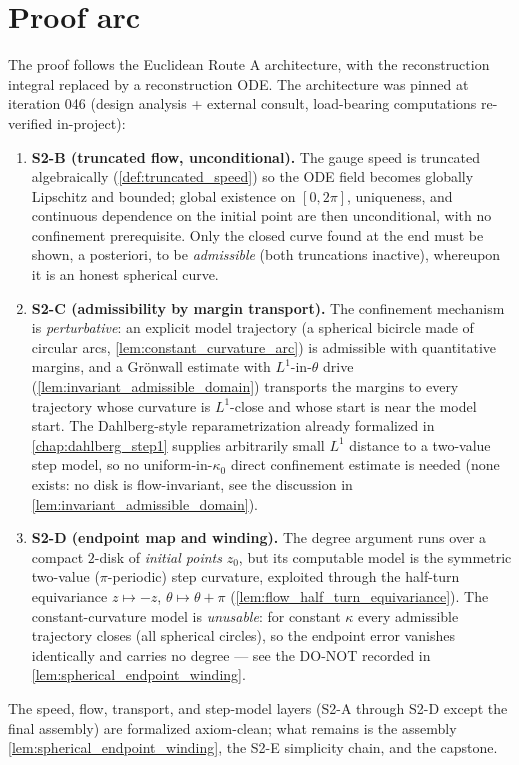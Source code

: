 \section{Proof arc}
\label{sec:sphere_arc}

The proof follows the Euclidean Route A architecture, with the reconstruction integral
replaced by a reconstruction ODE. The architecture was pinned at iteration 046
(design analysis + external consult, load-bearing computations re-verified in-project):
\begin{enumerate}
\item \textbf{S2-B (truncated flow, unconditional).} The gauge speed is truncated
  algebraically (\cref{def:truncated_speed}) so the ODE field becomes globally
  Lipschitz and bounded; global existence on $[0,2\pi]$, uniqueness, and continuous
  dependence on the initial point are then unconditional, with no confinement
  prerequisite. Only the closed curve found at the end must be shown, a posteriori, to
  be \emph{admissible} (both truncations inactive), whereupon it is an honest spherical
  curve.
\item \textbf{S2-C (admissibility by margin transport).} The confinement mechanism is
  \emph{perturbative}: an explicit model trajectory (a spherical bicircle made of
  circular arcs, \cref{lem:constant_curvature_arc}) is admissible with quantitative
  margins, and a Gr\"onwall estimate with $L^1$-in-$\theta$ drive
  (\cref{lem:invariant_admissible_domain}) transports the margins to every trajectory
  whose curvature is $L^1$-close and whose start is near the model start. The
  Dahlberg-style reparametrization already formalized in \cref{chap:dahlberg_step1}
  supplies arbitrarily small $L^1$ distance to a two-value step model, so no
  uniform-in-$\kappa_0$ direct confinement estimate is needed (none exists: no disk is
  flow-invariant, see the discussion in \cref{lem:invariant_admissible_domain}).
\item \textbf{S2-D (endpoint map and winding).} The degree argument runs over a compact
  $2$-disk of \emph{initial points} $z_0$, but its computable model is the symmetric
  two-value ($\pi$-periodic) step curvature, exploited through the half-turn
  equivariance $z\mapsto -z$, $\theta\mapsto\theta+\pi$
  (\cref{lem:flow_half_turn_equivariance}). The constant-curvature model is
  \emph{unusable}: for constant $\kappa$ every admissible trajectory closes (all
  spherical circles), so the endpoint error vanishes identically and carries no degree
  — see the DO-NOT recorded in \cref{lem:spherical_endpoint_winding}.
\end{enumerate}
The speed, flow, transport, and step-model layers (S2-A through S2-D except the final
assembly) are formalized axiom-clean; what remains is the assembly
\cref{lem:spherical_endpoint_winding}, the S2-E simplicity chain, and the capstone.

